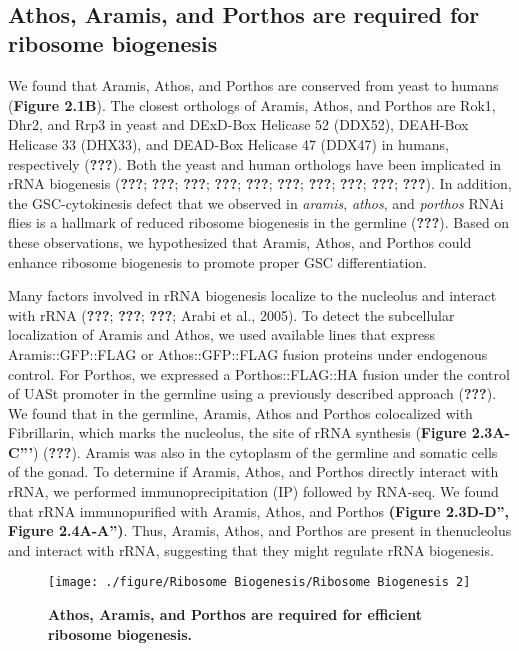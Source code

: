 \documentclass[12pt,oneside]{reedthesis}
\begin{document}

\textbf{\\
}

\hypertarget{athos-aramis-and-porthos-are-required-for-ribosome-biogenesis}{%
\subsection{Athos, Aramis, and Porthos are required for ribosome biogenesis}\label{athos-aramis-and-porthos-are-required-for-ribosome-biogenesis}}

We found that Aramis, Athos, and Porthos are conserved from yeast to humans (\textbf{Figure 2.1B}). The closest orthologs of Aramis, Athos, and Porthos are Rok1, Dhr2, and Rrp3 in yeast and DExD-Box Helicase 52 (DDX52), DEAH-Box Helicase 33 (DHX33), and DEAD-Box Helicase 47 (DDX47) in humans, respectively ({\textbf{???}}). Both the yeast and human orthologs have been implicated in rRNA biogenesis ({\textbf{???}}; {\textbf{???}}; {\textbf{???}}; {\textbf{???}}; {\textbf{???}}; {\textbf{???}}; {\textbf{???}}; {\textbf{???}}; {\textbf{???}}; {\textbf{???}}). In addition, the GSC-cytokinesis defect that we observed in \emph{aramis}, \emph{athos}, and \emph{porthos} RNAi flies is a hallmark of reduced ribosome biogenesis in the germline ({\textbf{???}}). Based on these observations, we hypothesized that Aramis, Athos, and Porthos could enhance ribosome biogenesis to promote proper GSC differentiation.

Many factors involved in rRNA biogenesis localize to the nucleolus and interact with rRNA ({\textbf{???}}; {\textbf{???}}; {\textbf{???}}; Arabi et al., 2005). To detect the subcellular localization of Aramis and Athos, we used available lines that express Aramis::GFP::FLAG or Athos::GFP::FLAG fusion proteins under endogenous control. For Porthos, we expressed a Porthos::FLAG::HA fusion under the control of UASt promoter in the germline using a previously described approach ({\textbf{???}}). We found that in the germline, Aramis, Athos and Porthos colocalized with Fibrillarin, which marks the nucleolus, the site of rRNA synthesis (\textbf{Figure 2.3A-C'''}) ({\textbf{???}}). Aramis was also in the cytoplasm of the germline and somatic cells of the gonad. To determine if Aramis, Athos, and Porthos directly interact with rRNA, we performed immunoprecipitation (IP) followed by RNA-seq. We found that rRNA immunopurified with Aramis, Athos, and Porthos \textbf{(Figure 2.3D-D'', Figure 2.4A-A'')}. Thus, Aramis, Athos, and Porthos are present in thenucleolus and interact with rRNA, suggesting that they might regulate rRNA biogenesis.
\begin{figure}

{\centering \texttt{[image: ./figure/Ribosome Biogenesis/Ribosome Biogenesis 2]} 

}

\caption[\textbf{Athos, Aramis, and Porthos are required for efficient ribosome biogenesis.}]{\textbf{Athos, Aramis, and Porthos are required for efficient ribosome biogenesis.}}\label{fig:unnamed-chunk-8}
\end{figure}
\end{document}
